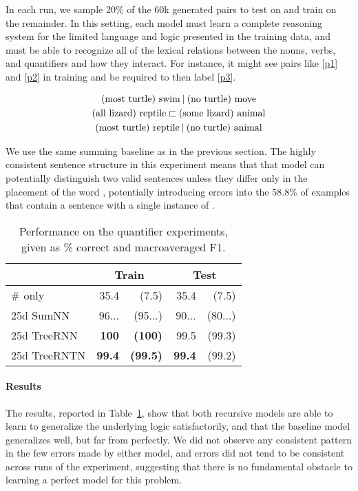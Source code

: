 In each run, we sample 20\% of the 60k generated pairs to test on and 
train on the remainder. In this setting, each model must learn a
complete reasoning system for the limited language and logic presented
in the training data, and must be able
to recognize all of the lexical relations between the nouns, verbs,
and quantifiers and how they interact. For instance, it might see
pairs like \eqref{p1} and \eqref{p2} in training and be required to 
then label \eqref{p3}.

\vspace{-0.6cm}
\begin{gather}
  \text{(most turtle) swim} \mathbin{|} \text{(no turtle) move}\label{p1}
  \\
  \text{(all lizard) reptile} \sqsubset  \text{(some lizard) animal}\label{p2}
  \\
  \text{(most turtle) reptile} \mathbin{|} \text{(no turtle) animal}\label{p3}
\end{gather}

We use the same summing baseline as in the previous section.
The highly consistent  sentence structure in this experiment means
that that model can potentially distinguish two valid sentences unless they
 differ only in the placement of the word , potentially introducing errors into 
the 58.8\% of examples that contain a sentence with a single
instance of .

\begin{table}[tp]
  \centering\small
    \begin{tabular}{ l r@{ \ }r r@{ \ }r }
    
    \toprule
    ~ & \multicolumn{2}{c}{Train} & \multicolumn{2}{c}{Test} \\
    \midrule
    $\mathbin{\#}$ only &	35.4 & (7.5)	& 35.4	& (7.5)\\
    25d SumNN	&	96...&	(95...)&	90...&	(80...)\\	
    25d TreeRNN	&	\textbf{100}&	\textbf{(100)}&	99.5&	(99.3)\\
    25d TreeRNTN	&	\textbf{99.4}&\textbf{(99.5)}&	\textbf{99.4} & (99.2)\\
    \bottomrule
  \end{tabular}
  
  \caption{Performance on the quantifier experiments, given as \% correct and macroaveraged F1.}
  \label{qresultstable}
\end{table} 

%
%
\paragraph{Results} The results, reported in Table~\ref{qresultstable}, show that both recursive models are able to learn to generalize the underlying logic satisfactorily, and that the baseline model generalizes well, but far from perfectly. We did not observe any consistent pattern in the few errors made by either model, and errors did not tend to be consistent across runs of the experiment, suggesting that there is no fundamental obstacle to learning a perfect model for this problem.

